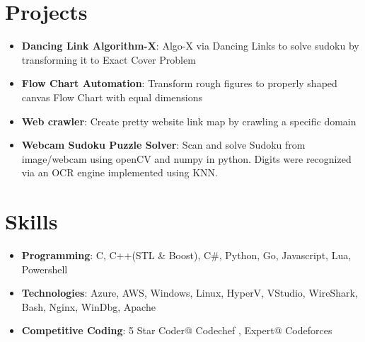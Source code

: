 \documentclass[letterpaper,11pt]{article}
\newcommand{\resumeItem}[2]{
  \item\small{
    \textbf{#1}{: #2 \vspace{-2pt}}
  }
}
\newcommand{\resumeSubItem}[2]{\resumeItem{#1}{#2}\vspace{-4pt}}
\newcommand{\resumeSubHeadingListStart}{\begin{itemize}[leftmargin=*]}
\newcommand{\resumeSubHeadingListEnd}{\end{itemize}}
\begin{document}
\section{Projects}
  \resumeSubHeadingListStart
    \resumeSubItem{Dancing Link Algorithm-X}
      {Algo-X via Dancing Links to solve sudoku by transforming it to Exact Cover Problem}
      \resumeSubItem{Flow Chart Automation}
      {Transform rough figures to properly shaped canvas Flow Chart with equal dimensions}
    \resumeSubItem{Web crawler}
      {Create pretty website link map by crawling a specific domain}
    \resumeSubItem{Webcam Sudoku Puzzle Solver}
      {Scan and solve Sudoku from image/webcam using openCV and numpy in python. Digits were recognized via an OCR engine implemented using KNN.}
  \resumeSubHeadingListEnd


\section{Skills}
  \resumeSubHeadingListStart
   \resumeSubItem{Programming}
      {C, C++(STL \& Boost), C\#, Python, Go, Javascript, Lua, Powershell}
      \resumeSubItem{Technologies}
      {Azure, AWS, Windows, Linux, HyperV, VStudio, WireShark, Bash, Nginx, WinDbg, Apache}
      \resumeSubItem{Competitive Coding}
      5 Star Coder@ Codechef {\href{https://codechef.com/users/code_zilla}{}, Expert@ Codeforces \href{https://codechef.com/users/code_zilla}{}
      }
  \resumeSubHeadingListEnd


%


\end{document}
